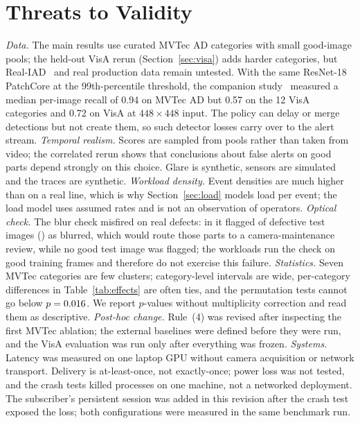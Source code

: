 \documentclass[conference]{IEEEtran}
\begin{document}
\section{Threats to Validity}
\emph{Data.} The main results use \NumCategories{} curated MVTec AD categories with small good-image pools; the held-out VisA rerun (Section~\ref{sec:visa}) adds \VisaNumCategories{} harder categories, but Real-IAD~\cite{wang2024realiad} and real production data remain untested. With the same ResNet-18 PatchCore at the 99th-percentile threshold, the companion study~\cite{sengar2026paperB} measured a median per-image recall of 0.94 on MVTec AD but 0.57 on the 12 VisA~\cite{zou2022visa} categories and 0.72 on VisA at $448\times448$ input. The policy can delay or merge detections but not create them, so such detector losses carry over to the alert stream.
\emph{Temporal realism.} Scores are sampled from pools rather than taken from video; the correlated rerun shows that conclusions about false alerts on good parts depend strongly on this choice. Glare is synthetic, sensors are simulated and the traces are synthetic.
\emph{Workload density.} Event densities are much higher than on a real line, which is why Section~\ref{sec:load} models load per event; the load model uses assumed rates and is not an observation of operators.
\emph{Optical check.} The blur check misfired on real defects: in \OpticalWorstCategory{} it flagged \OpticalWorstRate{} of defective test images (\OpticalWorstTypes{}) as blurred, which would route those parts to a camera-maintenance review, while no good test image was flagged; the workloads run the check on good training frames and therefore do not exercise this failure.
\emph{Statistics.} Seven MVTec categories are few clusters; category-level intervals are wide, per-category differences in Table~\ref{tab:effects} are often ties, and the permutation tests cannot go below $p=0.016{}$. We report $p$-values without multiplicity correction and read them as descriptive.
\emph{Post-hoc change.} Rule~(4) was revised after inspecting the first MVTec ablation; the external baselines were defined before they were run, and the VisA evaluation was run only after everything was frozen.
\emph{Systems.} Latency was measured on one laptop GPU without camera acquisition or network transport. Delivery is at-least-once, not exactly-once; power loss was not tested, and the crash tests killed processes on one machine, not a networked deployment. The subscriber's persistent session was added in this revision after the crash test exposed the loss; both configurations were measured in the same benchmark run.
\end{document}
